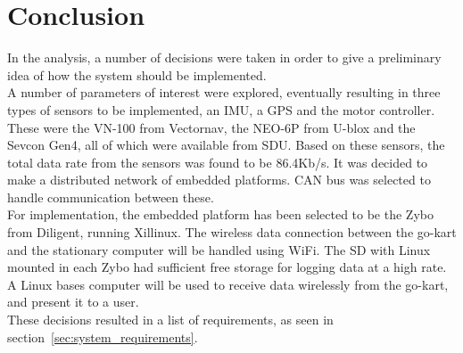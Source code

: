 





\section{Conclusion}
\label{sec:analysisconclusion}
In the analysis, a number of decisions were taken in order to give a preliminary idea of how the system should be implemented. \\

A number of parameters of interest were explored, eventually resulting in three types of sensors to be implemented, an IMU, a GPS and the motor controller.
These were the VN-100 from Vectornav, the NEO-6P from U-blox and the Sevcon Gen4, all of which were available from SDU.
Based on these sensors, the total data rate from the sensors was found to be 86.4Kb/s.
It was decided to make a distributed network of embedded platforms. 
CAN bus was selected to handle communication between these.\\

For implementation, the embedded platform has been selected to be the Zybo from Diligent, running Xillinux.
The wireless data connection between the go-kart and the stationary computer will be handled using WiFi.
The SD with Linux mounted in each Zybo had sufficient free storage for logging data at a high rate.
A Linux bases computer will be used to receive data wirelessly from the go-kart, and present it to a user. \\

These decisions resulted in a list of requirements, as seen in section~\ref{sec:system_requirements}.

